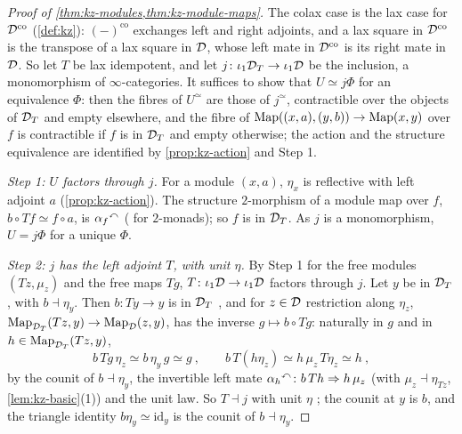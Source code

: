 \begin{proof}[Proof of \cref{thm:kz-modules,thm:kz-module-maps}]
%
The colax case is the lax case for $\mathcal{D}^{\mathrm{co}}$
(\cref{def:kz}): $(-)^{\mathrm{co}}$ exchanges left and right
adjoints, and a lax square in $\mathcal{D}^{\mathrm{co}}$ is the transpose of a lax
square in $\mathcal{D}$, whose left mate in $\mathcal{D}^{\mathrm{co}}$ is its right mate in $\mathcal{D}$.
So let $T$ be lax idempotent, and let
$j\colon \iota_{1}\mathcal{D}_{T} \to \iota_{1}\mathcal{D}$
be the inclusion, a monomorphism of $\infty$-categories.
It suffices to show that $U \simeq j\Phi$ for an equivalence $\Phi$:
then the fibres of $U^{\simeq}$ are those of $j^{\simeq}$, contractible over
the objects of $\mathcal{D}_{T}$ and empty elsewhere, and the fibre of
$\operatorname{Map}((x,a),(y,b)) \to \operatorname{Map}(x,y)$
over $f$ is contractible if $f$ is in $\mathcal{D}_{T}$ and empty otherwise; the action
and the structure equivalence are identified by \cref{prop:kz-action} and
Step 1.

\emph{Step 1: $U$ factors through $j$.} For a module $(x,a)$, $\eta_{x}$ is
reflective with left adjoint $a$ (\cref{prop:kz-action}).
The structure $2$-morphism of a module map over $f$,
$b \circ Tf \simeq f \circ a$,
is ${\alpha_{f}}^{\curvearrowleft}$ \cite[Lemma~10.6]{marmolejo1997doctrines}
(\cite[Cor.~6.3]{kellylack1997propertylike} for $2$-monads); so $f$ is in
$\mathcal{D}_{T}$. As $j$ is a monomorphism, $U = j\Phi$ for a unique $\Phi$.

\emph{Step 2: $j$ has the left adjoint $T$, with unit $\eta$.}
By Step 1 for the free modules $(Tz,\mu_{z})$ and the free maps $Tg$,
$T\colon \iota_{1}\mathcal{D} \to \iota_{1}\mathcal{D}$
factors through $j$. Let $y$ be in $\mathcal{D}_{T}$, with
$b \dashv \eta_{y}$.
Then $b\colon Ty \to y$ is in $\mathcal{D}_{T}$
\cite[Prop.~5.5]{marmolejo1997doctrines}
,
and for $z \in \mathcal{D}$ restriction along
$\eta_{z}$,
$\operatorname{Map}_{\mathcal{D}_{T}}(Tz,y) \to \operatorname{Map}_{\mathcal{D}}(z,y)$,
has the inverse
$g \mapsto b \circ Tg$:
naturally in $g$ and in
$h \in \operatorname{Map}_{\mathcal{D}_{T}}(Tz,y)$,
\begin{equation*}
b\,Tg\,\eta_{z} \simeq b\,\eta_{y}\,g \simeq g \ , \qquad b\,T(h\eta_{z})
\simeq h\,\mu_{z}\,T\eta_{z} \simeq h \ ,
\end{equation*}
by the counit of
$b \dashv \eta_{y}$,
the invertible left mate
${\alpha_{h}}^{\curvearrowleft}\colon b\,Th \Rightarrow h\,\mu_{z}$
(with
$\mu_{z} \dashv \eta_{Tz}$,
\cref{lem:kz-basic}(1)) and the unit law.
So $T \dashv j$ with unit $\eta$ \cite[Prop.~5.2.2.8]{htt}; the counit at $y$
is $b$, and the triangle identity
$b\eta_{y} \simeq \mathrm{id}_{y}$
is the counit of
$b \dashv \eta_{y}$.


\end{proof}
